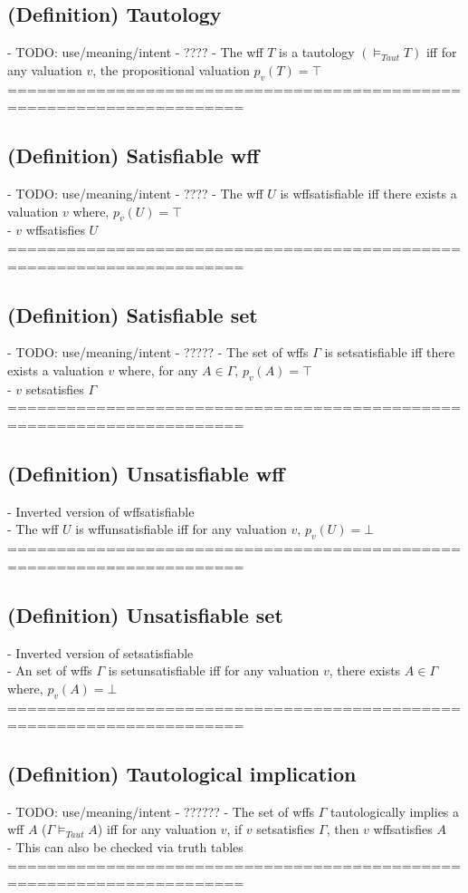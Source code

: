\documentclass{article}
\begin{document}
\subsection{(Definition) Tautology}
	- TODO: use/meaning/intent - ????
	- The wff $T$ is a tautology $(\vDash_{Taut} T)$ iff for any valuation $v$, the propositional valuation $p_v(T) = \top$ \\
	======================================================================
\subsection{(Definition) Satisfiable wff}
	- TODO: use/meaning/intent - ????
	- The wff $U$ is wffsatisfiable iff there exists a valuation $v$ where, $p_v(U) = \top$ \\
	- $v$ wffsatisfies $U$ \\
	======================================================================
\subsection{(Definition) Satisfiable set}
	- TODO: use/meaning/intent - ?????
	- The set of wffs $\Gamma$ is setsatisfiable iff there exists a valuation $v$ where, for any $A \in \Gamma$, $p_v(A) = \top$ \\
	- $v$ setsatisfies $\Gamma$ \\
	======================================================================
\subsection{(Definition) Unsatisfiable wff}
	- Inverted version of wffsatisfiable \\
	- The wff $U$ is wffunsatisfiable iff for any valuation $v$, $p_v(U) = \bot$
	======================================================================
\subsection{(Definition) Unsatisfiable set}
	- Inverted version of setsatisfiable \\
	- An set of wffs $\Gamma$ is setunsatisfiable iff for any valuation $v$, there exists $A \in \Gamma$ where, $p_v(A) = \bot$ \\
	======================================================================
\subsection{(Definition) Tautological implication}
	- TODO: use/meaning/intent - ??????
	- The set of wffs $\Gamma$ tautologically implies a wff $A$ ($\Gamma \vDash_{Taut} A$) iff for any valuation $v$, if $v$ setsatisfies $\Gamma$, then $v$ wffsatisfies $A$ \\
	- This can also be checked via truth tables
	======================================================================
\end{document}
